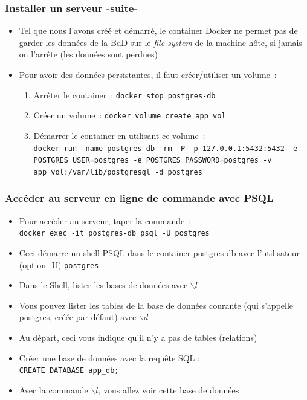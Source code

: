 \documentclass[aspectratio=169,10pt]{beamer}
\begin{document}
\begin{frame}
\frametitle{Installer un serveur -suite-}
\begin{itemize}	
	\item Tel que nous l'avons créé et démarré, le container Docker ne permet pas de garder les données de la BdD sur le \textit{file system} de la machine hôte, si jamais on l'arrête (les données sont perdues)	
		\item Pour avoir des données persistantes, il faut créer/utiliser un volume~:
		\begin{enumerate}
			\item Arrêter le container~: \texttt{docker stop postgres-db}
			\item Créer un volume~: \texttt{docker volume create app\_vol}
			\item Démarrer le container en utilisant ce volume~:\\
			{\footnotesize \texttt{docker run ---name postgres-db ---rm -P -p 127.0.0.1:5432:5432 -e POSTGRES\_USER=postgres -e POSTGRES\_PASSWORD=postgres -v app\_vol:/var/lib/postgresql -d postgres} }
		\end{enumerate}
		
	\end{itemize}
\end{frame}	

\begin{frame}
	\frametitle{Accéder au serveur en ligne de commande avec PSQL}
	\begin{itemize}			
		\item Pour accéder au serveur, taper la commande~:\\
			\texttt{docker exec -it postgres-db psql -U postgres}
		\item[] Ceci démarre un shell PSQL dans le container postgres-db avec l'utilisateur (option -U) \texttt{postgres}
		\item Dans le Shell, lister les bases de données avec $\backslash l$
		\item Vous pouvez lister les tables de la base de données courante (qui s'appelle postgres, créée par défaut) avec $\backslash d$
		\item Au départ, ceci vous indique qu'il n'y a pas de tables (relations)
		\item Créer une base de données avec la requête SQL :\\
		\texttt{CREATE DATABASE app\_db;}
		\item[] Avec la commande $\backslash l$, vous allez voir cette base de données
		
\end{itemize}
\end{frame}	
\end{document}
